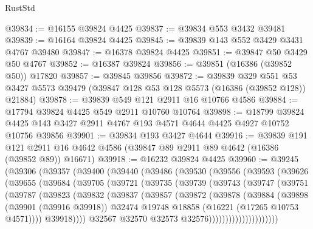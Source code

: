 \begin{lexlean}{RustStd}
\begin{coremodule}
@39834 := @16155 @39824 @4425
@39837 := @39834 @553 @3432 @39481
@39839 := @16164 @39824 @4425
@39845 := @39839 @143 @552 @3429 @3431 @4767 @39480
@39847 := @16378 @39824 @4425
@39851 := @39847 @50 @3429 @50 @4767
@39852 := @16387 @39824
@39856 := @39851 (@16386 (@39852 @50)) @17820
@39857 := @39845 @39856
@39872 := @39839
    @329
    @551
    @53
    @3427
    @5573
    @39479
    (@39847 @128 @53 @128 @5573 (@16386 (@39852 @128)) @21884)
@39878 := @39839 @549 @121 @2911 @16 @10766 @4586
@39884 := @17794 @39824 @4425 @549 @2911 @10760 @10764
@39898 := @18799
    @39824
    @4425
    @143
    @3427
    @2911
    @4767
    @193
    @4571
    @4644
    @4425
    @4927
    @10752
    @10756
    @39856
@39901 := @39834 @193 @3427 @4644
@39916 := @39839
    @191
    @121
    @2911
    @16
    @4642
    @4586
    (@39847 @89 @2911 @89 @4642 (@16386 (@39852 @89)) @16671)
@39918 := @16232 @39824 @4425
@39960 := @39245
    (@39306
      (@39357
        (@39400
          (@39440
            (@39486
              (@39530
                (@39556
                  (@39593
                    (@39626
                      (@39655
                        (@39684
                          (@39705
                            (@39721
                              (@39735
                                (@39739
                                  (@39743
                                    (@39747
                                      (@39751
                                        (@39787
                                          (@39823
                                            (@39832
                                              (@39837
                                                (@39857
                                                  (@39872
                                                    (@39878
                                                      (@39884
                                                        (@39898
                                                          (@39901 (@39916 @39918))
                                                          @32474
                                                          @19748
                                                          @18858
                                                          (@16221 (@17265 @10753 @4571))))
                                                      @39918))))
                                              @32567
                                              @32570
                                              @32573
                                              @32576)))))))))))))))))))))

\end{coremodule}
\end{lexlean}
